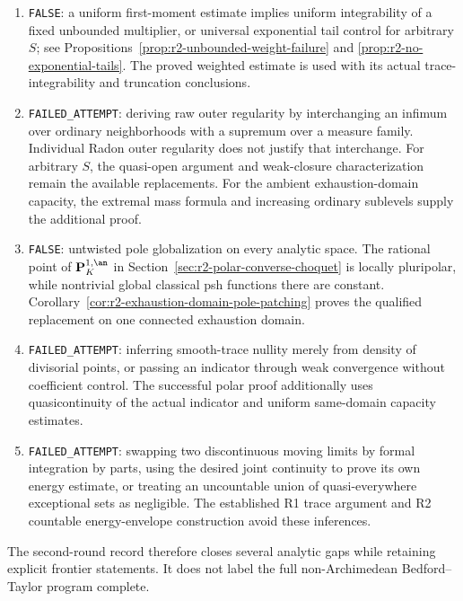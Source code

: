 \begin{enumerate}
\item \texttt{FALSE}: a uniform first-moment estimate implies uniform
integrability of a fixed unbounded multiplier, or universal exponential
tail control for arbitrary $S$; see
Propositions~\ref{prop:r2-unbounded-weight-failure} and
\ref{prop:r2-no-exponential-tails}. The proved weighted estimate is
used with its actual trace-integrability and truncation conclusions.

\item \texttt{FAILED\_ATTEMPT}: deriving raw outer regularity by
interchanging an infimum over ordinary neighborhoods with a supremum
over a measure family. Individual Radon outer regularity does not
justify that interchange. For arbitrary $S$, the quasi-open argument
and weak-closure characterization remain the available replacements.
For the ambient exhaustion-domain capacity, the extremal mass formula
and increasing ordinary sublevels supply the additional proof.

\item \texttt{FALSE}: untwisted pole globalization on every analytic
space. The rational point of $\mathbf P^{1,\an}_K$ in
Section~\ref{sec:r2-polar-converse-choquet} is locally pluripolar,
while nontrivial global classical psh functions there are constant.
Corollary~\ref{cor:r2-exhaustion-domain-pole-patching} proves the
qualified replacement on one connected exhaustion domain.

\item \texttt{FAILED\_ATTEMPT}: inferring smooth-trace nullity merely
from density of divisorial points, or passing an indicator through
weak convergence without coefficient control. The successful polar
proof additionally uses quasicontinuity of the actual indicator and
uniform same-domain capacity estimates.

\item \texttt{FAILED\_ATTEMPT}: swapping two discontinuous moving
limits by formal integration by parts, using the desired joint
continuity to prove its own energy estimate, or treating an
uncountable union of quasi-everywhere exceptional sets as negligible.
The established R1 trace argument and R2 countable energy-envelope
construction avoid these inferences.
\end{enumerate}

The second-round record therefore closes several analytic gaps while
retaining explicit frontier statements. It does not label the full
non-Archimedean Bedford--Taylor program complete.
